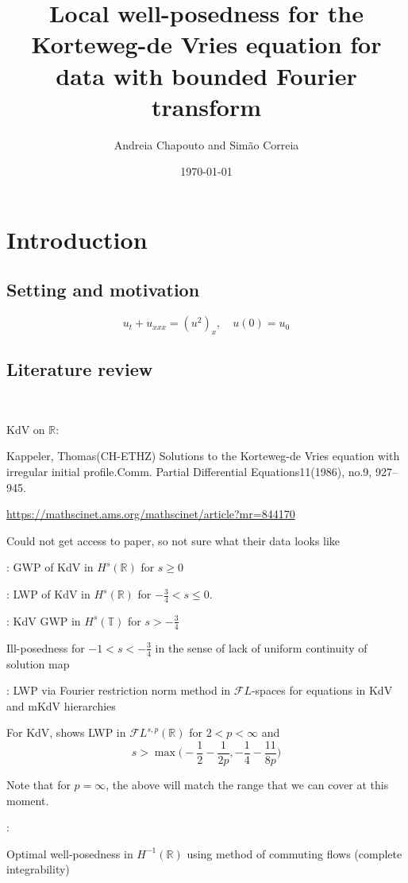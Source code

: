 \documentclass[a4paper, 11pt]{amsart}
\date{\today}
\author{Andreia Chapouto and Sim\~ao Correia}
\title{Local well-posedness for the Korteweg-de Vries equation for data with bounded Fourier transform}
\newcommand{\T}{\mathbb{T}}
\newcommand{\R}{\mathbb{R}}
\theoremstyle{plain}
\theoremstyle{definition}
\theoremstyle{remark}
\newcommand{\5}{\text{V}}
\newcommand{\FL}{\mathcal{F} L}
\numberwithin{equation}{section}
\theoremstyle{mytheoremstyle} \newtheorem{nota}[thm]{Remark}
\theoremstyle{mytheoremstyle} \newtheorem{exemplo}[thm]{Example}
\newcommand{\red}{\color{red}}
\begin{document}
\maketitle
\section{Introduction}
\subsection{Setting and motivation}
\begin{equation}\tag{KdV}\label{KdV}
	u_t + u_{xxx} = (u^2)_x,\quad u(0)=u_0
\end{equation}


\subsection{Literature review}\

KdV on $\R$:

\begin{itemize}


\item Kappeler, Thomas(CH-ETHZ)
Solutions to the Korteweg-de Vries equation with irregular initial profile.Comm. Partial Differential Equations11(1986), no.9, 927–945.

\url{https://mathscinet.ams.org/mathscinet/article?mr=844170}

Could not get access to paper, so not sure what their data looks like


\item \cite{B93}: GWP of KdV in $H^s(\R)$ for $s\ge 0$


\item \cite{KPV96}: LWP of KdV in $H^s(\R)$ for $-\frac34<s\le 0$.


\item \cite{CCT03}: KdV GWP in $H^{s}(\T)$ for $s>-\frac34$

Ill-posedness for $-1<s<-\frac34$ in the sense of lack of uniform continuity of solution map

{\red
\item \cite{G10}: LWP via Fourier restriction norm method in $\FL$-spaces for equations in KdV and mKdV hierarchies

For KdV, shows LWP in $\FL^{s,p}(\R)$ for $2<p<\infty$ and
$$s>\max\Big( -\frac12 - \frac{1}{2p}, -\frac14 - \frac{11}{8p} \Big)$$


Note that for $p=\infty$, the above will match the range that we can cover at this moment.
}

\item \cite{KV19}:

Optimal well-posedness in $H^{-1}(\R)$ using method of commuting flows (complete integrability)
\end{itemize}
\end{document}
